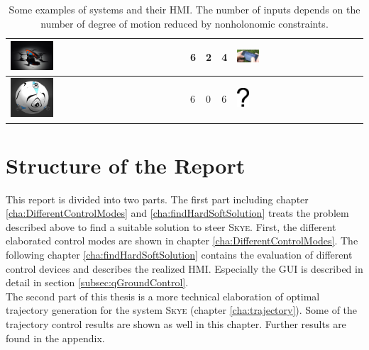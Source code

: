 \begin{table}[H]
\begin{center}
\begin{tabular}{MMMMM}
  \hline
    \includegraphics[width = 0.25\textwidth]{ardrone.jpg}
   & 	6 & 2  & 4 & \includegraphics[width = 0.18\textwidth]{iphone.jpg} \\
  \hline
    \includegraphics[width = 0.25\textwidth]{skye.jpg}
   & 	6 & 0  & 6 & \includegraphics[width = 0.1\textwidth]{questionmark.eps} \\
 \hline
 \end{tabular}
 \caption{Some examples of systems and their HMI. The number of inputs depends on the number of degree of motion reduced by nonholonomic constraints.}\vspace{1ex}
 \label{tab:systems_hmi}
\end{center}
\end{table}


\section{Structure of the Report}
\label{structure}
This report is divided into two parts. The first part including chapter \ref{cha:DifferentControlModes} and \ref{cha:findHardSoftSolution} treats the problem described above to find a suitable solution to steer \textsc{Skye}. First, the different elaborated control modes are shown in chapter \ref{cha:DifferentControlModes}. The following chapter \ref{cha:findHardSoftSolution} contains the evaluation of different control devices and describes the realized HMI. Especially the GUI is described in detail in section \ref{subsec:qGroundControl}. \\ The second part of this thesis is a more technical elaboration of optimal trajectory generation for the system \textsc{Skye} (chapter \ref{cha:trajectory}). Some of the trajectory control results are shown as well in this chapter. Further results are found in the appendix.